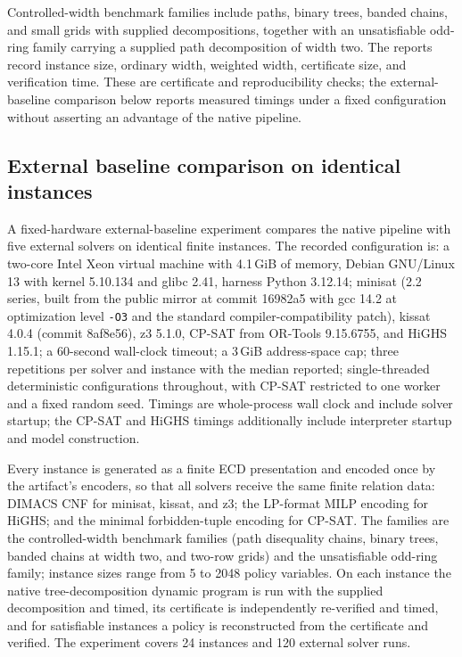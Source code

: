 \documentclass[11pt]{article}
\theoremstyle{plain}
\theoremstyle{definition}
\theoremstyle{remark}
\begin{document}
Controlled-width benchmark families include paths, binary trees,
banded chains, and small grids with supplied decompositions, together with an
unsatisfiable odd-ring family carrying a supplied path decomposition of width
two.  The reports record instance size, ordinary width, weighted width,
certificate size, and verification time.  These are certificate and
reproducibility checks; the external-baseline comparison below reports measured
timings under a fixed configuration without asserting an advantage of the
native pipeline.

\subsection{External baseline comparison on identical instances}
\label{subsec:external-baselines}

A fixed-hardware external-baseline experiment compares the native pipeline with
five external solvers on identical finite instances.  The recorded
configuration is: a two-core Intel Xeon virtual machine with 4.1\,GiB of
memory, Debian GNU/Linux 13 with kernel 5.10.134 and glibc 2.41, harness
Python 3.12.14; minisat (2.2 series, built from the public mirror at commit
16982a5 with gcc 14.2 at optimization level \texttt{-O3} and the standard
compiler-compatibility patch), kissat 4.0.4 (commit 8af8e56), z3 5.1.0, CP-SAT
from OR-Tools 9.15.6755, and HiGHS 1.15.1; a 60-second wall-clock timeout; a
3\,GiB address-space cap; three repetitions per solver and instance with the
median reported; single-threaded deterministic configurations throughout, with
CP-SAT restricted to one worker and a fixed random seed.  Timings are
whole-process wall clock and include solver startup; the CP-SAT and HiGHS
timings additionally include interpreter startup and model construction.

Every instance is generated as a finite ECD presentation and encoded once by
the artifact's encoders, so that all solvers receive the same finite relation
data: DIMACS CNF for minisat, kissat, and z3; the LP-format MILP encoding for
HiGHS; and the minimal forbidden-tuple encoding for CP-SAT.  The families are
the controlled-width benchmark families (path disequality chains, binary
trees, banded chains at width two, and two-row grids) and the unsatisfiable
odd-ring family; instance sizes range from 5 to 2048 policy variables.  On each
instance the native tree-decomposition dynamic program is run with the supplied
decomposition and timed, its certificate is independently re-verified and
timed, and for satisfiable instances a policy is reconstructed from the
certificate and verified.  The experiment covers 24 instances and 120 external
solver runs.
\end{document}

